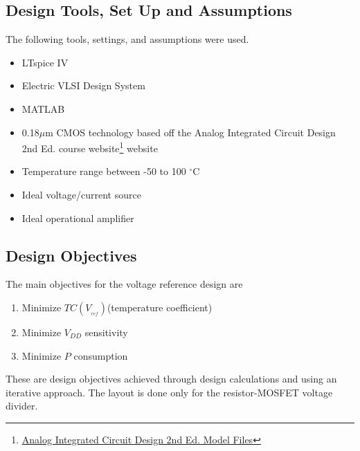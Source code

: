 \documentclass[conference]{IEEEtran}
\begin{document}
\subsection{Design Tools, Set Up and Assumptions}
The following tools, settings, and assumptions were used.
\begin{itemize}
  \item LTspice IV
  \item Electric VLSI Design System
  \item MATLAB
  \item 0.18$\mu$m CMOS technology based off the Analog Integrated Circuit Design 2nd Ed. course website\footnote{\href{http://analogicdesign.com/students/netlists-models/model-files/}{Analog Integrated Circuit Design 2nd Ed. Model Files}} website
  \item Temperature range between -50 to 100 $^\circ$C
  \item Ideal voltage/current source
  \item Ideal operational amplifier
\end{itemize}

\subsection{Design Objectives}
The main objectives for the voltage reference design are
\begin{enumerate}
  \item Minimize $TC(V_{_{ref}})$\;(temperature coefficient)
  \item Minimize $V_{DD}$ sensitivity
  \item Minimize $P$ consumption
\end{enumerate}
These are design objectives achieved through design calculations and using an iterative approach.  The layout is done only for the resistor-MOSFET voltage divider.
\end{document}
